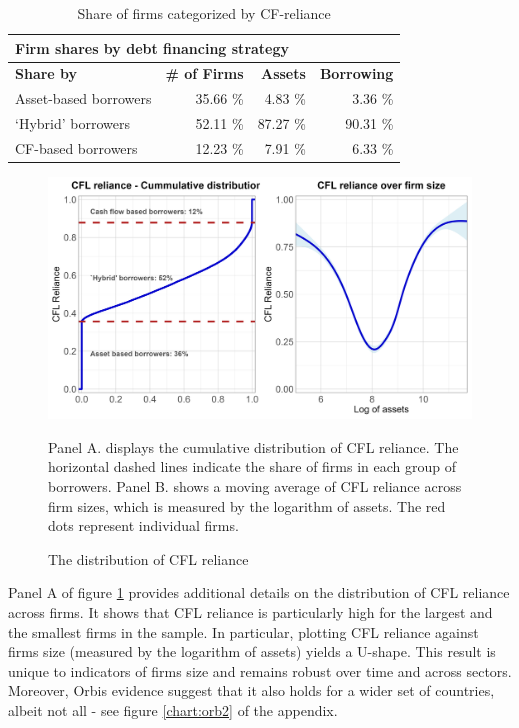 \documentclass[12pt]{article}
\begin{document}
\begin{table}[h!]
    \centering
    \begin{tabular}{l|rrr}
    \multicolumn{4}{l}{\textbf{Firm shares by debt financing strategy}} \\
    \hline
    \hspace{2.2cm} \textbf{Share by} & \textbf{\# of Firms} & \textbf{Assets}  & \textbf{Borrowing} \\  
    Asset-based borrowers & 35.66 \% & 4.83 \% & 3.36 \% \\ 
    `Hybrid' borrowers & 52.11 \% & 87.27 \% & 90.31  \% \\ 
    CF-based borrowers & 12.23 \% & 7.91 \% & 6.33  \% \\ 
       \bottomrule
    \end{tabular}
    \caption{\small Share of firms categorized by CF-reliance} 
    \label{tab:shares}
    \end{table}

\begin{figure}[H]  %
    \centering
    \caption{The distribution of CFL reliance} \label{chart:CFLcdf}
    \includegraphics[width=1\textwidth]{smoothcfd.png}
     \begin{justify}
     \small Panel A. displays the cumulative distribution of CFL reliance. The horizontal dashed lines indicate the share of firms in each group of borrowers. Panel B. shows a moving average of CFL reliance across firm sizes, which is measured by the logarithm of assets. The red dots represent individual firms. 
    \end{justify}
\end{figure}

\noindent Panel A of figure \ref{chart:CFLcdf} provides additional details on the distribution of CFL reliance across firms. It shows that CFL reliance is particularly high for the largest and the smallest firms in the sample. In particular, plotting CFL reliance against firms size (measured by the logarithm of assets) yields a U-shape. This result is unique to indicators of firms size and remains robust over time and across sectors. Moreover, Orbis evidence suggest that it also holds for a wider set of countries, albeit not all - see figure \ref{chart:orb2} of the appendix. 
\end{document}
